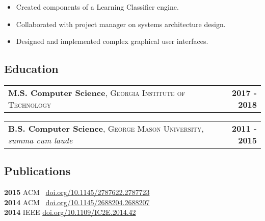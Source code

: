 \documentclass[10pt,letterpaper]{article}
\newenvironment{details}
{\begin{itemize}}
{\end{itemize}}
\begin{document}
\begin{details}
\item Created components of a Learning Classifier engine.
\item Collaborated with project manager on systems architecture design.
\item Designed and implemented complex graphical user interfaces.
\end{details}


\subsection{Education}

\noindent
\begin{tabularx}{\textwidth}{@{}X r@{}}
  \textbf{M.S. Computer Science}, \textsc{Georgia Institute of Technology} & \textbf{2017 - 2018}
\end{tabularx}

\noindent
\begin{tabularx}{\textwidth}{@{}X r@{}}
  \textbf{B.S. Computer Science}, \textsc{George Mason University}, \emph{summa cum laude} & \textbf{2011 - 2015}
\end{tabularx}


\subsection{Publications}

\noindent
\textbf{2015} ACM \ \href{https://doi.org/10.1145/2787622.2787723}{doi.org/10.1145/2787622.2787723} \\
\textbf{2014} ACM \ \href{https://doi.org/10.1145/2688204.2688207}{doi.org/10.1145/2688204.2688207} \\
\textbf{2014} IEEE  \href{https://doi.org/10.1109/IC2E.2014.42}{doi.org/10.1109/IC2E.2014.42}
\end{document}

